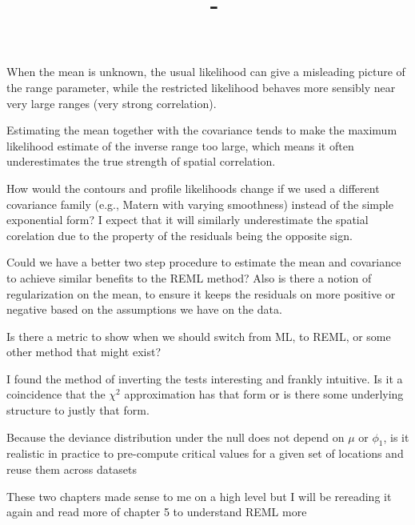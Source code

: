 \documentclass[answers,12pt,addpoints]{exam}
\author{\name}
\title{\course \ - \assignment}
\begin{document}
\maketitle

\begin{questions}
\question When the mean is unknown, the usual likelihood can give a misleading picture of the range parameter, while the restricted likelihood behaves more sensibly near very large ranges (very strong correlation).

\question Estimating the mean together with the covariance tends to make the maximum likelihood estimate of the inverse range too large, which means it often underestimates the true strength of spatial correlation.

\question How would the contours and profile likelihoods change if we used a different covariance family (e.g., Matern with varying smoothness) instead of the simple exponential form? I expect that it will similarly underestimate the spatial corelation due to the property of the residuals being the opposite sign.

\question Could we have a better two step procedure to estimate the mean and covariance to achieve similar benefits to the REML method? Also is there a notion of regularization on the mean, to ensure it keeps the residuals on more positive or negative based on the assumptions we have on the data. 

\question Is there a metric to show when we should switch from ML, to REML, or some other method that might exist?

\question I found the method of inverting the tests interesting and frankly intuitive. Is it a coincidence that the $\chi^2$ approximation has that form or is there some underlying structure to justly that form. 

\question Because the deviance distribution under the null does not depend on $\mu$ or $\phi_1$, is it realistic in practice to pre-compute critical values for a given set of locations and reuse them across datasets

\question These two chapters made sense to me on a high level but I will be rereading it again and read more of chapter 5 to understand REML more 

\end{questions}
\end{document}
